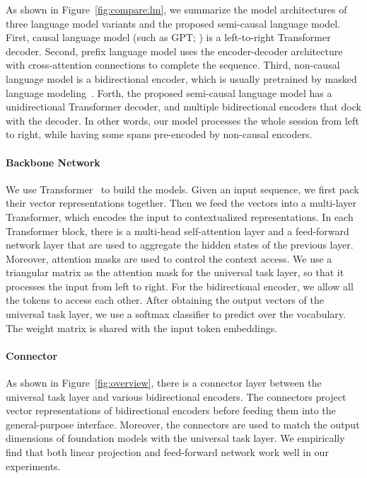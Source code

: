 \documentclass{article}
\theoremstyle{plain}
\theoremstyle{definition}
\theoremstyle{remark}
\begin{document}
As shown in Figure~\ref{fig:compare:lm}, we summarize the model architectures of three language model variants and the proposed semi-causal language model.
First, causal language model (such as GPT; \citealt{gpt3}) is a left-to-right Transformer decoder.
Second, prefix language model uses the encoder-decoder architecture with cross-attention connections to complete the sequence.
Third, non-causal language model is a bidirectional encoder, which is usually pretrained by masked language modeling~\citep{bert}.
Forth, the proposed semi-causal language model has a unidirectional Transformer decoder, and multiple bidirectional encoders that dock with the decoder.
In other words, our model processes the whole session from left to right, while having some spans pre-encoded by non-causal encoders.


\paragraph{Backbone Network}
We use Transformer~\citep{transformer} to build the models.
Given an input sequence, we first pack their vector representations together. Then we feed the vectors into a multi-layer Transformer, which encodes the input to contextualized representations.
In each Transformer block, there is a multi-head self-attention layer and a feed-forward network layer that are used to aggregate the hidden states of the previous layer.
Moreover, attention masks are used to control the context access.
We use a triangular matrix as the attention mask for the universal task layer, so that it processes the input from left to right.
For the bidirectional encoder, we allow all the tokens to access each other.
After obtaining the output vectors of the universal task layer, we use a softmax classifier to predict over the vocabulary.
The weight matrix is shared with the input token embeddings.


\paragraph{Connector}
As shown in Figure~\ref{fig:overview}, there is a connector layer between the universal task layer and various bidirectional encoders.
The connectors project vector representations of bidirectional encoders before feeding them into the general-purpose interface.
Moreover, the connectors are used to match the output dimensions of foundation models with the universal task layer.
We empirically find that both linear projection and feed-forward network work well in our experiments.
\end{document}
